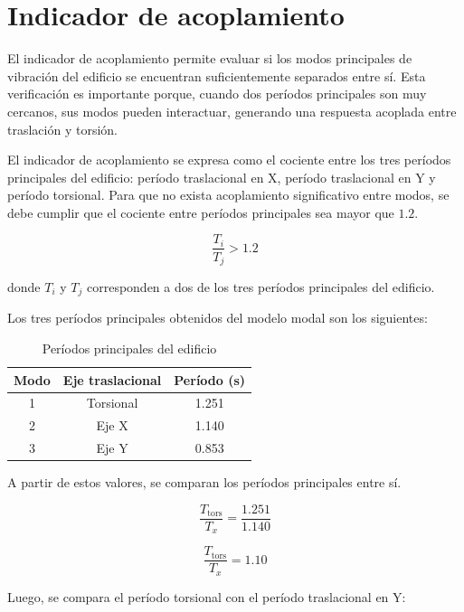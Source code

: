 \section{Indicador de acoplamiento}

El indicador de acoplamiento permite evaluar si los modos principales de vibración del edificio se encuentran suficientemente separados entre sí. Esta verificación es importante porque, cuando dos períodos principales son muy cercanos, sus modos pueden interactuar, generando una respuesta acoplada entre traslación y torsión.

El indicador de acoplamiento se expresa como el cociente entre los tres períodos principales del edificio: período traslacional en X, período traslacional en Y y período torsional. Para que no exista acoplamiento significativo entre modos, se debe cumplir que el cociente entre períodos principales sea mayor que $1.2$.

\begin{equation}
\frac{T_i}{T_j} > 1.2
\end{equation}

donde $T_i$ y $T_j$ corresponden a dos de los tres períodos principales del edificio. 

Los tres períodos principales obtenidos del modelo modal son los siguientes:

\begin{table}[H]
\centering
\caption{Períodos principales del edificio}
\begin{tabular}{ccc}
\hline
Modo & Eje traslacional & Período (s) \\
\hline
1 & Torsional & 1.251 \\
2 & Eje X & 1.140 \\
3 & Eje Y & 0.853 \\
\hline
\end{tabular}
\end{table}

A partir de estos valores, se comparan los períodos principales entre sí.

\begin{equation}
\frac{T_{\text{tors}}}{T_x} = \frac{1.251}{1.140}
\end{equation}

\begin{equation}
\frac{T_{\text{tors}}}{T_x} = 1.10
\end{equation}

Luego, se compara el período torsional con el período traslacional en Y:

